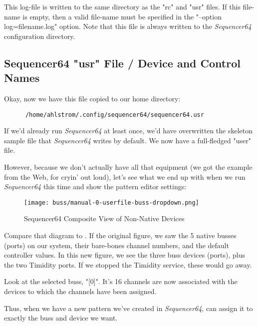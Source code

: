    This log-file is written to the same directory as the "rc" and "usr" files.
   If this file-name is empty, then a valid file-name must be specified
   in the "--option log=filename.log" option.  Note that this file
   is always written to the \textsl{Sequencer64} configuration directory.

\subsection{Sequencer64 "usr" File / Device and Control Names}
\label{subsec:seq64_usr_file_midi_bus_results}

   Okay, now we have this file copied to our home directory:

   \begin{verbatim}
      /home/ahlstrom/.config/sequencer64/sequencer64.usr
   \end{verbatim}

   If we'd already run \textsl{Sequencer64} at least once, we'd have
   overwritten the skeleton sample file that \textsl{Sequencer64}
   writes by default.  We now have a full-fledged "user" file.

   However, because we don't actually have all that equipment (we got the
   example from the Web, for cryin' out loud), let's see what we end up with
   when we run \textsl{Sequencer64} this time and show the pattern editor
   settings:

\begin{figure}[H]
   \centering 
   \texttt{[image: buss/manual-0-userfile-buss-dropdown.png]}
   \caption{Sequencer64 Composite View of Non-Native Devices}
   \label{fig:seq64_manual_0_userfile_buss_dropdown}
\end{figure}

   Compare that diagram to .
   If the original figure, we saw the 5 native busses (ports) on our system,
   their bare-bones channel numbers, and the default controller values.  In
   this new figure, we see the three buss devices (ports), plus the two
   Timidity ports.  If we stopped the Timidity service, these would go away.

   Look at the selected buss, "[0]".  It's 16 channels are now associated with
   the devices to which the channels have been assigned.

   Thus, when we have a new pattern we've created in \textsl{Sequencer64},
   can assign it to exactly the buss and device we want.

